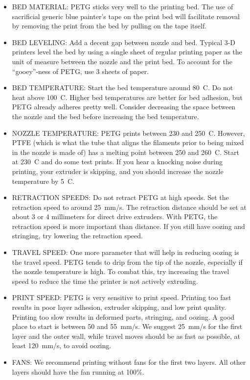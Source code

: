 \begin{itemize}
    \item BED MATERIAL: PETG sticks very well to the printing bed. The use of sacrificial generic blue painter's tape on the print bed will facilitate removal by removing the print from the bed by pulling on the tape itself.
    \item BED LEVELING: Add a decent gap between nozzle and bed. Typical 3-D printers level the bed by using a single sheet of regular printing paper as the unit of measure between the nozzle and the print bed. To account for the ``gooey''-ness of PETG, use 3 sheets of paper.
    \item BED TEMPERATURE: Start the bed temperature around 80\textdegree~C. Do not heat above 100\textdegree~C. Higher bed temperatures are better for bed adhesion, but PETG already adheres pretty well. Consider decreasing the space between the nozzle and the bed before increasing the bed temperature. 
    \item NOZZLE TEMPERATURE: PETG prints between 230 and 250\textdegree~C. However, PTFE (which is what the tube that aligns the filaments prior to being mixed in the nozzle is made of) has a melting point between 250 and 260\textdegree~C. Start at 230\textdegree~C and do some test prints. If you hear a knocking noise during printing, your extruder is skipping, and you should increase the nozzle temperature by 5\textdegree~C. 
    \item RETRACTION SPEEDS: Do not retract PETG at high speeds. Set the retraction speed to around 25~mm/s. The retraction distance should be set at about 3 or 4 millimeters for direct drive extruders. With PETG, the retraction speed is more important than distance. If you still have oozing and stringing, try lowering the retraction speed.
    \item TRAVEL SPEED: One more parameter that will help in reducing oozing is the travel speed. PETG tends to drip from the tip of the nozzle, especially if the nozzle temperature is high. To combat this, try increasing the travel speed to reduce the time the printer is not actively extruding.
    \item PRINT SPEED: PETG is very sensitive to print speed. Printing too fast results in poor layer adhesion, extruder skipping, and low print quality. Printing too slow results in deformed parts, stringing, and oozing. A good place to start is between 50 and 55~mm/s. We suggest 25~mm/s for the first layer and the outer wall, while travel moves should be as fast as possible, at least 120~mm/s, to avoid oozing.
    \item FANS: We recommend printing without fans for the first two layers. All other layers should have the fan running at 100\%. 
\end{itemize}


